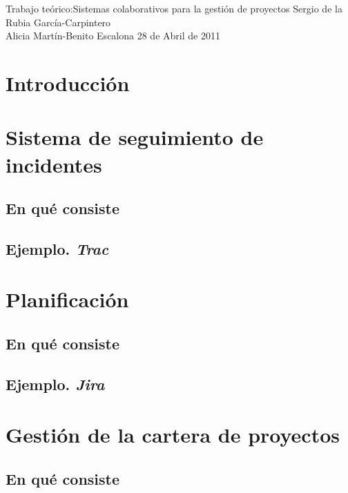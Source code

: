 \documentclass[11pt,a4paper,spanish,twoside]{report}
\begin{document}


{Trabajo teórico:}{Sistemas colaborativos para la gestión de proyectos}
{Sergio de la Rubia García-Carpintero\\Alicia Martín-Benito Escalona}
{28 de Abril de 2011}


\tableofcontents


\chapter{Introducción}

\chapter{Sistema de seguimiento de incidentes}
\section{En qué consiste}
\section{Ejemplo. \emph{Trac}}

\chapter{Planificación}
\section{En qué consiste}
\section{Ejemplo. \emph{Jira}}

\chapter{Gestión de la cartera de proyectos}
\section{En qué consiste}
\end{document}
